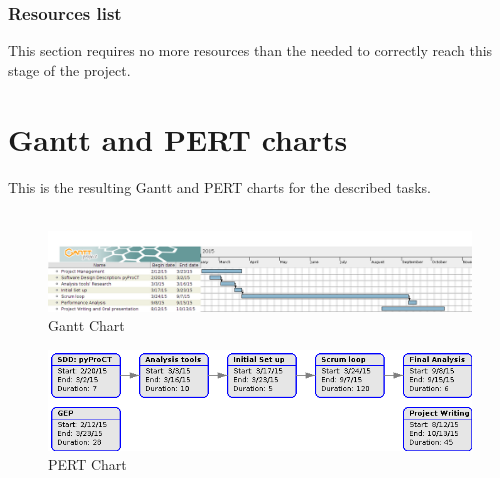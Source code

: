 \subsubsection{Resources list}

This section requires no more resources than the needed to correctly reach this stage of the project.


\section{Gantt and PERT charts}
\label{sec:gantt_pert}

This is the resulting Gantt and PERT charts for the described tasks.
\\
\\

\begin{figure}[h]
\includegraphics[width=\textwidth]{img/gantt.png}
\caption{Gantt Chart}
\end{figure}
\begin{figure}[h]
\includegraphics[width=\textwidth]{img/pert.png}
\caption{PERT Chart}
\end{figure}

\FloatBarrier
